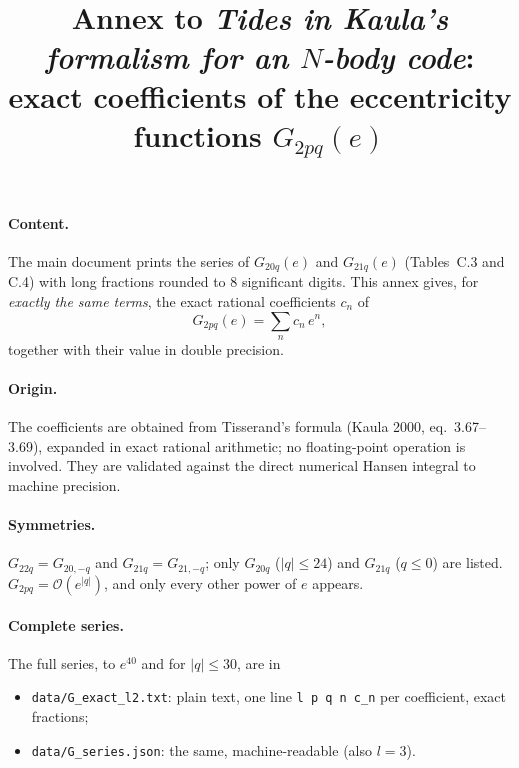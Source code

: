 \documentclass[10pt,a4paper]{article}
\title{Annex to \emph{Tides in Kaula's formalism for an $N$-body code}:\\exact coefficients of the eccentricity functions $G_{2pq}(e)$}
\date{}
\begin{document}
\maketitle

\paragraph{Content.} The main document prints the series of $G_{20q}(e)$ and $G_{21q}(e)$ (Tables~C.3 and C.4) with long fractions rounded to 8 significant digits. This annex gives, for \emph{exactly the same terms}, the exact rational coefficients $c_n$ of
\[
  G_{2pq}(e)=\sum_n c_n\,e^n ,
\]
together with their value in double precision.

\paragraph{Origin.} The coefficients are obtained from Tisserand's formula (Kaula 2000, eq.~3.67--3.69), expanded in exact rational arithmetic; no floating-point operation is involved. They are validated against the direct numerical Hansen integral to machine precision.

\paragraph{Symmetries.} $G_{22q}=G_{20,-q}$ and $G_{21q}=G_{21,-q}$; only $G_{20q}$ ($|q|\le24$) and $G_{21q}$ ($q\le0$) are listed. $G_{2pq}=\mathcal O(e^{|q|})$, and only every other power of $e$ appears.

\paragraph{Complete series.} The full series, to $e^{40}$ and for $|q|\le30$, are in
\begin{itemize}
  \item \texttt{data/G\_exact\_l2.txt}: plain text, one line \texttt{l p q n c\_n} per coefficient, exact fractions;
  \item \texttt{data/G\_series.json}: the same, machine-readable (also $l=3$).
\end{itemize}

\small

\end{document}
